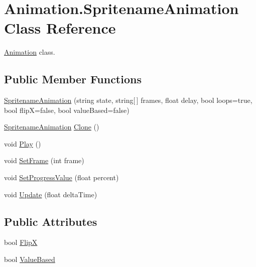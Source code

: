 \hypertarget{class_animation_1_1_spritename_animation}{}\section{Animation.\+Spritename\+Animation Class Reference}
\label{class_animation_1_1_spritename_animation}


\hyperlink{namespace_animation}{Animation} class.  


\subsection*{Public Member Functions}
\begin{DoxyCompactItemize}
\item 
\hyperlink{class_animation_1_1_spritename_animation_a7190ea75bd48e32fc9f844f8a658f81c}{Spritename\+Animation} (string state, string\mbox{[}$\,$\mbox{]} frames, float delay, bool loops=true, bool flipX=false, bool value\+Based=false)
\item 
\hyperlink{class_animation_1_1_spritename_animation}{Spritename\+Animation} \hyperlink{class_animation_1_1_spritename_animation_aefb5f0cb99d118fddb80d6c6b1cda259}{Clone} ()
\item 
void \hyperlink{class_animation_1_1_spritename_animation_ab3090c281fd78dc36b60a5d68228ba2a}{Play} ()
\item 
void \hyperlink{class_animation_1_1_spritename_animation_a13b93a18c5fbd310ae04d025c4de9626}{Set\+Frame} (int frame)
\item 
void \hyperlink{class_animation_1_1_spritename_animation_ab1129dc6dce8ca439c814361615d7e25}{Set\+Progress\+Value} (float percent)
\item 
void \hyperlink{class_animation_1_1_spritename_animation_a67c81b43217c7f5e5a98c173fdedf75c}{Update} (float delta\+Time)
\end{DoxyCompactItemize}
\subsection*{Public Attributes}
\begin{DoxyCompactItemize}
\item 
bool \hyperlink{class_animation_1_1_spritename_animation_a69bdef513330620af6450f0d42c2e855}{FlipX}
\item 
bool \hyperlink{class_animation_1_1_spritename_animation_a7581517b3f04ae5ecf45f14ba17b6a71}{Value\+Based}
\end{DoxyCompactItemize}
